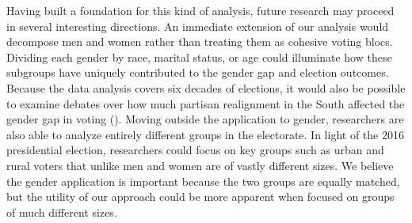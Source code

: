 \documentclass[12pt
               ,final
               ]{article}
\begin{document}
Having built a foundation for this kind of analysis, future research may proceed in several interesting directions. An immediate extension of our analysis would decompose men and women rather than treating them as cohesive voting blocs. Dividing each gender by race, marital status, or age could illuminate how these subgroups have uniquely contributed to the gender gap and election outcomes. Because the data analysis covers six decades of elections, it would also be possible to examine debates over how much partisan realignment in the South affected the gender gap in voting (\citealt{kaufmann2006ps,norrander1999evolution,ondercin2018}). Moving outside the application to gender, researchers are also able to analyze entirely different groups in the electorate. In light of the 2016 presidential election, researchers could focus on key groups such as urban and rural voters that unlike men and women are of vastly different sizes. We believe the gender application is important because the two groups are equally matched, but the utility of our approach could be more apparent when focused on groups of much different sizes.

\end{document}
